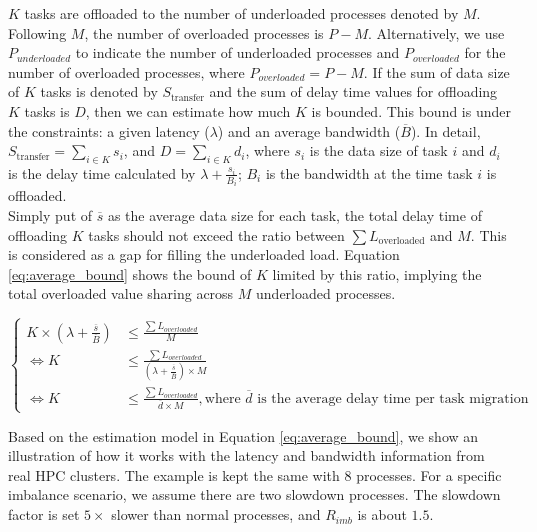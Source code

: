 \noindent $K$ tasks are offloaded to the number of underloaded processes denoted by $M$. Following $M$, the number of overloaded processes is $P-M$. Alternatively, we use $P_{underloaded}$ to indicate the number of underloaded processes and $P_{overloaded}$ for the number of overloaded processes, where $P_{overloaded} = P-M$. If the sum of data size of $K$ tasks is denoted by $S_{\text{transfer}}$ and the sum of delay time values for offloading $K$ tasks is $D$, then we can estimate how much $K$ is bounded. This bound is under the constraints: a given latency ($\lambda$) and an average bandwidth ($\overline{B}$). In detail, $S_{\text{transfer}} = \sum_{i \in K} s_{i}$, and $D = \sum_{i \in K} d_{i}$, where $s_{i}$ is the data size of task $i$ and $d_{i}$ is the delay time calculated by $\lambda + \frac{s_{i}}{B_{i}}$; $B_{i}$ is the bandwidth at the time task $i$ is offloaded.\\
			
Simply put of $\overline{s}$ as the average data size for each task, the total delay time of offloading $K$ tasks should not exceed the ratio between $\sum L_{\text{overloaded}}$ and $M$. This is considered as a gap for filling the underloaded load. Equation \ref{eq:average_bound} shows the bound of $K$ limited by this ratio, implying the total overloaded value sharing across $M$ underloaded processes.

\begin{equation} \label{eq:average_bound}
	\begin{cases}
		K \times (\lambda + \frac{\overline{s}}{\overline{B}}) &\leq \frac{\sum L_{overloaded}}{M} \\
		\Leftrightarrow K   &\leq \frac{\sum L_{overloaded}}{(\lambda + \frac{\overline{s}}{\overline{B}}) \times M} \\
		\Leftrightarrow K   &\leq \frac{\sum L_{overloaded}}{\overline{d} \times M}, \text{where } \overline{d} \text{ is the average delay time per task migration}
	\end{cases}
\end{equation}

\noindent Based on the estimation model in Equation \ref{eq:average_bound}, we show an illustration of how it works with the latency and bandwidth information from real HPC clusters. The example is kept the same with $8$ processes. For a specific imbalance scenario, we assume there are two slowdown processes. The slowdown factor is set $5\times$ slower than normal processes, and $R_{imb}$ is about $1.5$. \\

